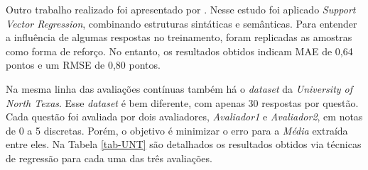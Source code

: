 Outro trabalho realizado foi apresentado por \cite{heilman2015}. Nesse estudo foi aplicado \textit{Support Vector Regression}, combinando estruturas sintáticas e semânticas. Para entender a influência de algumas respostas no treinamento, foram replicadas as amostras como forma de reforço. No entanto, os resultados obtidos indicam MAE de 0,64 pontos e um RMSE de 0,80 pontos.

Na mesma linha das avaliações contínuas também há o \textit{dataset} da \textit{University of North Texas}. Esse \textit{dataset} é bem diferente, com apenas 30 respostas por questão. Cada questão foi avaliada por dois avaliadores, \textit{Avaliador1} e \textit{Avaliador2}, em notas de 0 a 5 discretas. Porém, o objetivo é minimizar o erro para a \textit{Média} extraída entre eles. Na Tabela \ref{tab-UNT} são detalhados os resultados obtidos via técnicas de regressão para cada uma das três avaliações.


